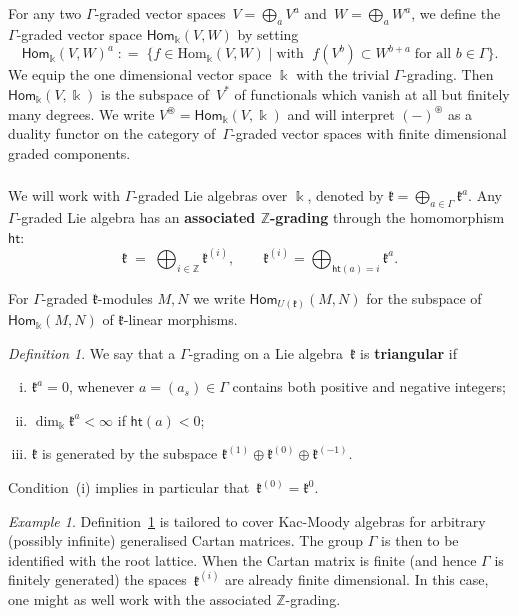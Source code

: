 \documentclass[11pt]{amsart}
\newcommand{\htt}{\mathsf{ht}}
\newcommand{\fHom}{{\mathsf{Hom}}}
\newcommand{\fnul}{{0}}
\newcommand{\Hom}{\mathrm{Hom}}
\newcommand{\mk}{\Bbbk}
\newcommand{\fk}{\mathfrak{k}}
\newcommand{\mZ}{\mathbb{Z}}
\numberwithin{equation}{section}
\theoremstyle{plain}
\theoremstyle{remark}
\newtheorem{ddef}[subsubsection]{Definition}
\theoremstyle{remark}
\newtheorem{ex}[subsubsection]{Example}
\theoremstyle{construction}
\begin{document}
For any two $\Gamma$-graded vector spaces~$V=\bigoplus_a V^{a}$ and~$W=\bigoplus_a W^{a}$, we define the $\Gamma$-graded vector space $\fHom_{\mk}(V,W)$ by {setting}
$$\fHom_{\mk}(V,W)^a\;{:}=\;\{f\in \Hom_{\mk}(V,W)\;|\; \mbox{with }\; f(V^b)\subset W^{b+a}\;\mbox{for all $b\in\Gamma$}\}.$$
We equip the one dimensional vector space $\mk$ with the trivial $\Gamma$-grading. Then $\fHom_{\mk}(V,\mk)$ is the subspace of~$V^\ast$ of functionals which vanish {at} all but finitely many degrees. {We write  $V^{\circledast}=\fHom_{\mk}(V,\mk)$ and}  will interpret $(-)^\circledast$ as a duality functor on the category of~$\Gamma$-graded vector spaces with finite dimensional graded components.

\subsubsection{}We will work with $\Gamma$-graded Lie algebras over $\mk$, denoted by
$\fk=\bigoplus_{a\in\Gamma}\fk^a.$
Any $\Gamma$-graded Lie algebra has an {\bf associated $\mZ$-grading} through the homomorphism $\htt$:
$$\fk\;=\;\bigoplus_{i\in\mZ}\fk^{(i)},\qquad\fk^{(i)}=\bigoplus_{\htt(a)=i}\fk^{a}.$$

For $\Gamma$-graded $\fk$-modules $M,N$ we write $\fHom_{U(\fk)}(M,N)$ for the subspace of $\fHom_{\mk}(M,N)$ of $\fk$-linear morphisms.

\begin{ddef}\label{defg}
We say that a $\Gamma$-grading on a Lie algebra~$\fk$ is {\bf triangular} if
\begin{enumerate}[(i)]
\item $\fk^a=0$, whenever $a=(a_s)\in \Gamma$ contains both positive and negative integers;
\item $\dim_{\mk}\fk^a<\infty$ if $\htt(a)<0$;
\item $\fk$ is generated by the subspace $\fk^{(1)}\oplus\fk^{(0)}\oplus\fk^{(-1)}$.
\end{enumerate}
\end{ddef}
Condition~(i) implies in particular that~$\fk^{(0)}=\fk^{\fnul}$.
\begin{ex}
Definition~\ref{defg} is tailored to cover Kac-Moody algebras for arbitrary (possibly infinite) generalised Cartan matrices. The group $\Gamma$ is then to be identified with the root lattice. When the Cartan matrix is finite (and hence $\Gamma$ is finitely generated) the spaces~$\fk^{(i)}$ are already finite dimensional. In this case, one might as well work with the associated $\mZ$-grading.
\end{ex}
\end{document}
